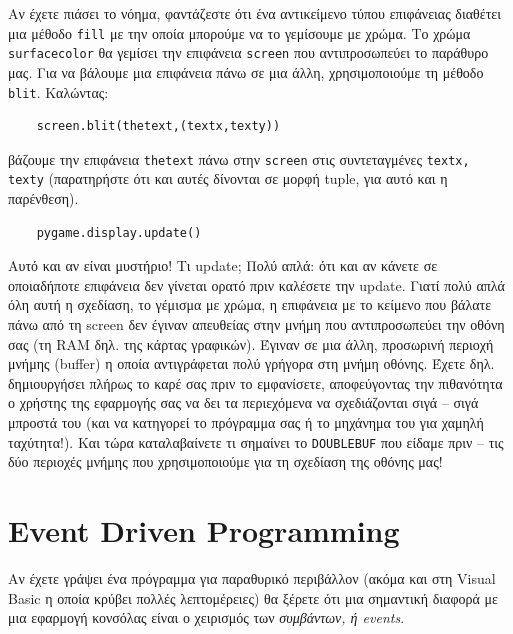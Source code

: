Αν έχετε πιάσει το νόημα, φαντάζεστε ότι ένα αντικείμενο τύπου επιφάνειας διαθέτει μια μέθοδο {\tt fill} με την οποία μπορούμε να το γεμίσουμε με χρώμα. Το χρώμα {\tt surfacecolor} θα γεμίσει την επιφάνεια {\tt screen} που αντιπροσωπεύει το παράθυρο μας.
Για να βάλουμε μια επιφάνεια πάνω σε μια άλλη, χρησιμοποιούμε τη μέθοδο {\tt blit}. Καλώντας:

\begin{verbatim}
    screen.blit(thetext,(textx,texty))
\end{verbatim}

βάζουμε την επιφάνεια {\tt thetext} πάνω στην {\tt screen} στις συντεταγμένες {\tt textx, texty} (παρατηρήστε ότι και αυτές δίνονται σε μορφή tuple,  για αυτό και η παρένθεση).

\begin{verbatim}
    pygame.display.update()
\end{verbatim}

Αυτό και αν είναι μυστήριο! Τι update; Πολύ απλά: ότι και αν κάνετε σε οποιαδήποτε επιφάνεια δεν γίνεται ορατό πριν καλέσετε την update. Γιατί πολύ απλά όλη αυτή η σχεδίαση, το γέμισμα με χρώμα, η επιφάνεια με το κείμενο που βάλατε πάνω από τη screen δεν έγιναν απευθείας στην μνήμη που αντιπροσωπεύει την οθόνη σας (τη RAM δηλ. της κάρτας γραφικών). Έγιναν σε μια άλλη, προσωρινή περιοχή μνήμης (buffer) η οποία αντιγράφεται πολύ γρήγορα στη μνήμη οθόνης. Έχετε δηλ. δημιουργήσει πλήρως το καρέ σας πριν το εμφανίσετε, αποφεύγοντας την πιθανότητα ο χρήστης της εφαρμογής σας να δει τα περιεχόμενα να σχεδιάζονται σιγά -- σιγά μπροστά του (και να κατηγορεί το πρόγραμμα σας ή το μηχάνημα του για χαμηλή ταχύτητα!). Και τώρα καταλαβαίνετε τι σημαίνει το {\tt DOUBLEBUF} που είδαμε πριν -- τις δύο περιοχές μνήμης που χρησιμοποιούμε για τη σχεδίαση της οθόνης μας!

\section{Event Driven Programming}
\label{section:event-driven-programming}
Αν έχετε γράψει ένα πρόγραμμα για παραθυρικό περιβάλλον (ακόμα και στη Visual Basic η οποία κρύβει πολλές λεπτομέρειες) θα ξέρετε ότι μια σημαντική διαφορά με μια εφαρμογή κονσόλας είναι ο χειρισμός των {\em συμβάντων, ή events}.

